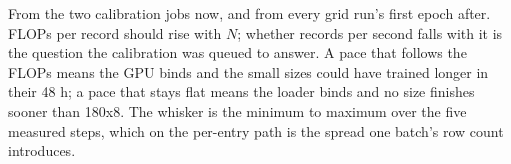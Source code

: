 From the two calibration jobs now, and from every grid run's first epoch after.
FLOPs per record should rise with $N$; whether records per second falls with it
is the question the calibration was queued to answer. A pace that follows the
FLOPs means the GPU binds and the small sizes could have trained longer in their
48 h; a pace that stays flat means the loader binds and no size finishes sooner
than 180x8. The whisker is the minimum to maximum over the five measured steps,
which on the per-entry path is the spread one batch's row count introduces.
